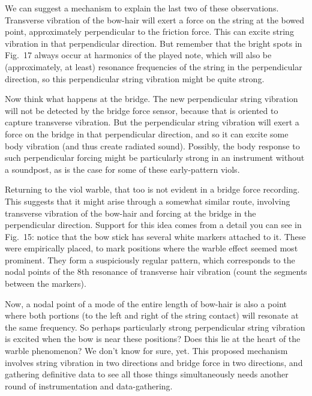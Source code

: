   We can suggest a mechanism to explain the last two of these observations. 
  Transverse vibration of the bow-hair will exert a force on the string at the 
  bowed point, approximately perpendicular to the friction force. This can 
  excite string vibration in that perpendicular direction. But remember that 
  the bright spots in Fig.\ 17 always occur at harmonics of the played note, 
  which will also be (approximately, at least) resonance frequencies of the 
  string in the perpendicular direction, so this perpendicular string vibration 
  might be quite strong. 

  Now think what happens at the bridge. The new perpendicular string vibration 
  will not be detected by the bridge force sensor, because that is oriented to 
  capture transverse vibration. But the perpendicular string vibration will 
  exert a force on the bridge in that perpendicular direction, and so it can 
  excite some body vibration (and thus create radiated sound). Possibly, the 
  body response to such perpendicular forcing might be particularly strong in 
  an instrument without a soundpost, as is the case for some of these 
  early-pattern viols. 

  Returning to the viol warble, that too is not evident in a bridge force 
  recording. This suggests that it might arise through a somewhat similar 
  route, involving transverse vibration of the bow-hair and forcing at the 
  bridge in the perpendicular direction. Support for this idea comes from a 
  detail you can see in Fig.\ 15: notice that the bow stick has several white 
  markers attached to it. These were empirically placed, to mark positions 
  where the warble effect seemed most prominent. They form a suspiciously 
  regular pattern, which corresponds to the nodal points of the 8th resonance 
  of transverse hair vibration (count the segments between the markers). 

  Now, a nodal point of a mode of the entire length of bow-hair is also a point 
  where both portions (to the left and right of the string contact) will 
  resonate at the same frequency. So perhaps particularly strong perpendicular 
  string vibration is excited when the bow is near these positions? Does this 
  lie at the heart of the warble phenomenon? We don’t know for sure, yet. This 
  proposed mechanism involves string vibration in two directions and bridge 
  force in two directions, and gathering definitive data to see all those 
  things simultaneously needs another round of instrumentation and 
  data-gathering. 

